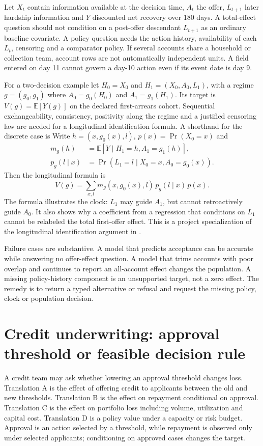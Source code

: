 Let $X_t$ contain information available at the decision time, $A_t$ the offer, $L_{t+1}$ later hardship information and $Y$ discounted net recovery over 180 days. A total-effect question should not condition on a post-offer descendant $L_{t+1}$ as an ordinary baseline covariate. A policy question needs the action history, availability of each $L_t$, censoring and a comparator policy. If several accounts share a household or collection team, account rows are not automatically independent units. A field entered on day 11 cannot govern a day-10 action even if its event date is day 9.

For a two-decision example let $H_0=X_0$ and $H_1=(X_0,A_0,L_1)$, with a regime $g=(g_0,g_1)$ where $A_0=g_0(H_0)$ and $A_1=g_1(H_1)$. Its target is $V(g)=\mathbb E[Y(g)]$ on the declared first-arrears cohort. Sequential exchangeability, consistency, positivity along the regime and a justified censoring law are needed for a longitudinal identification formula. A shorthand for the discrete case is
Write $h=(x,g_0(x),l)$, $p(x)=\Pr(X_0=x)$ and
\begin{align*}
 m_g(h)&=\mathbb E[Y\mid H_1=h,A_1=g_1(h)],\\
 p_g(l\mid x)&=\Pr(L_1=l\mid X_0=x,A_0=g_0(x)).
\end{align*}
Then the longitudinal formula is
\[
 V(g)=\sum_{x,l}m_g(x,g_0(x),l)\,p_g(l\mid x)\,p(x).
\]
The formula illustrates the clock: $L_1$ may guide $A_1$, but cannot retroactively guide $A_0$. It also shows why a coefficient from a regression that conditions on $L_1$ cannot be relabeled the total first-offer effect. This is a project specialization of the longitudinal identification argument in \citet{hernan2020}.

Failure cases are substantive. A model that predicts acceptance can be accurate while answering no offer-effect question. A model that trims accounts with poor overlap and continues to report an all-account effect changes the population. A missing policy-history component is an unsupported target, not a zero effect. The remedy is to return a typed alternative or refusal and request the missing policy, clock or population decision.

\section{Credit underwriting: approval threshold or feasible decision rule}

A credit team may ask whether lowering an approval threshold changes loss. Translation A is the effect of offering credit to applicants between the old and new thresholds. Translation B is the effect on repayment conditional on approval. Translation C is the effect on portfolio loss including volume, utilization and capital cost. Translation D is a policy value under a capacity or risk budget. Approval is an action selected by a threshold, while repayment is observed only under selected applicants; conditioning on approved cases changes the target.

